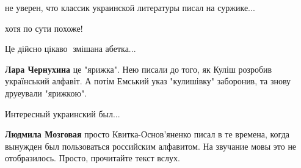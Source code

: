 \begin{itemize}
\begin{itemize}
не уверен, что классик украинской литературы писал на суржике...

\begin{itemize}
 
хотя по сути похоже!
\end{itemize}
\end{itemize}

 
Це дійсно цікаво🤔 змішана абетка...

\begin{itemize}
 
\textbf{Лара Чернухина} це "ярижка". Нею писали до того, як Куліш розробив
український алфавіт. А потім Емський указ "кулишівку" заборонив, та знову
друеували "ярижкою".
\end{itemize}

 
Интересный украинский был...

\begin{itemize}
 
\textbf{Людмила Мозговая} просто Квитка-Основ'яненко писал в те времена, когда
вынужден был пользоваться российским алфавитом. На звучание мовы это не
отобразилось. Просто, прочитайте текст вслух.
\end{itemize}


\end{itemize}
